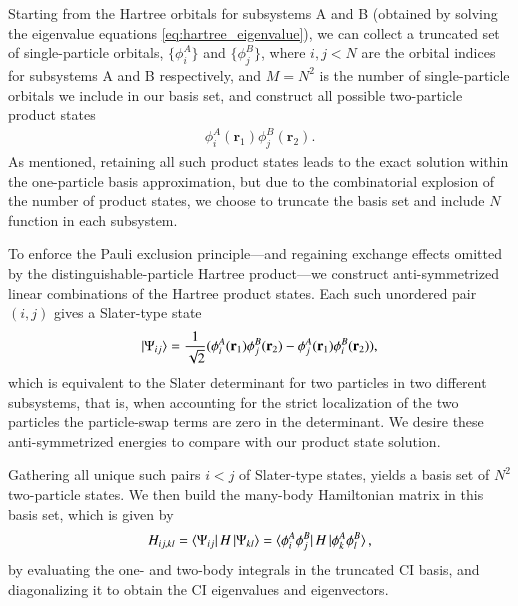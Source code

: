 \documentclass{subfiles}
\begin{document}
Starting from the Hartree orbitals for subsystems A and B (obtained by solving the eigenvalue equations \ref{eq:hartree_eigenvalue}), we can collect a truncated set of single-particle orbitals, $\{\phi^A_i\}$ and $\{\phi^B_j\}$, where $i,j<N$ are the orbital indices for subsystems A and B respectively, and $M=N^2$ is the number of single-particle orbitals we include in our basis set, and construct all possible two-particle product states
\begin{align*}
    \phi_i^A(\mathbf{r}_1)\phi_j^B(\mathbf{r}_2).
\end{align*}  
As mentioned, retaining all such product states leads to the exact solution within the one-particle basis approximation, but due to the combinatorial explosion of the number of product states, we choose to truncate the basis set and include $N$ function in each subsystem. 

To enforce the Pauli exclusion principle—and regaining exchange effects omitted by the distinguishable-particle Hartree product—we construct anti-symmetrized linear combinations of the Hartree product states. Each such unordered pair $(i,j)$ gives a Slater-type state
\begin{align*}
    \ket{\Psi_{ij}} = \frac{1}{\sqrt{2}}(\phi_i^A(\mathbf{r}_1)\phi_j^B(\mathbf{r}_2) - \phi_j^A(\mathbf{r}_1)\phi_i^B(\mathbf{r}_2)),
\end{align*}
which is equivalent to the Slater determinant for two particles in two different subsystems, that is, when accounting for the strict localization of the two particles the particle-swap terms are zero in the determinant. We desire these anti-symmetrized energies to compare with our product state solution. 

Gathering all unique such pairs $i<j$ of Slater-type states, yields a basis set of $N^2$ two-particle states. We then build the many-body Hamiltonian matrix in this basis set, which is given by
\begin{align*}
    H_{ij,kl} = \bra{\Psi_{ij}}H\ket{\Psi_{kl}} = \bra{\phi_i^A\phi_j^B}H\ket{\phi_k^A\phi_l^B},
\end{align*}
by evaluating the one- and two-body integrals in the truncated CI basis, and diagonalizing it to obtain the CI eigenvalues and eigenvectors. 

\end{document}

